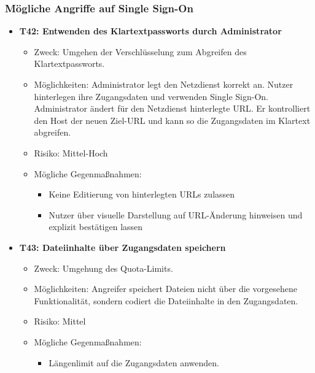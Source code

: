 \documentclass[12pt,DIV14,BCOR10mm,a4paper,parskip=half-,headsepline,headinclude,english,ngerman,bibliography=totocnumbered]{scrreprt}
\begin{document}
\subsubsection{Mögliche Angriffe auf Single Sign-On}
\begin{itemize}

  \hypertarget{threat42}{}
  \item \textbf{T42: Entwenden des Klartextpassworts durch Administrator}
  \begin{itemize}
    \item Zweck: Umgehen der Verschlüsselung zum Abgreifen des Klartextpassworts.
    \item Möglichkeiten: Administrator legt den Netzdienst korrekt an. Nutzer hinterlegen ihre Zugangsdaten und verwenden Single Sign-On. Administrator ändert für den Netzdienst hinterlegte URL. Er kontrolliert den Host der neuen Ziel-URL und kann so die Zugangsdaten im Klartext abgreifen.
    \item Risiko: Mittel-Hoch
    \item Mögliche Gegenmaßnahmen:
      \begin{itemize}
      \item Keine Editierung von hinterlegten URLs zulassen
      \item Nutzer über visuelle Darstellung auf URL-Änderung hinweisen und explizit bestätigen lassen
      \end{itemize}
  \end{itemize}

  \hypertarget{threat43}{}
  \item \textbf{T43: Dateiinhalte über Zugangsdaten speichern}
  \begin{itemize}
    \item Zweck: Umgehung des Quota-Limits.
    \item Möglichkeiten: Angreifer speichert Dateien nicht über die vorgesehene Funktionalität, sondern codiert die Dateiinhalte in den Zugangsdaten.
    \item Risiko: Mittel
    \item Mögliche Gegenmaßnahmen:
      \begin{itemize}
      	\item Längenlimit auf die Zugangsdaten anwenden.
      \end{itemize}
  \end{itemize}


\end{itemize}
\end{document}

